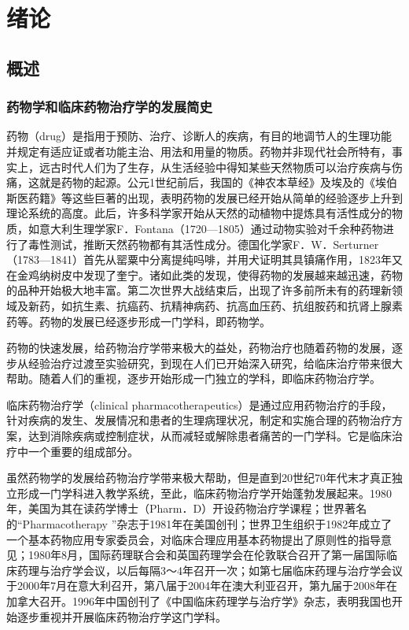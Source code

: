 \chapter{绪论}

\section{概述}

\subsection{药物学和临床药物治疗学的发展简史}

药物（drug）是指用于预防、治疗、诊断人的疾病，有目的地调节人的生理功能并规定有适应证或者功能主治、用法和用量的物质。药物并非现代社会所特有，事实上，远古时代人们为了生存，从生活经验中得知某些天然物质可以治疗疾病与伤痛，这就是药物的起源。公元1世纪前后，我国的《神农本草经》及埃及的《埃伯斯医药籍》等这些巨著的出现，表明药物的发展已经开始从简单的经验逐步上升到理论系统的高度。此后，许多科学家开始从天然的动植物中提炼具有活性成分的物质，如意大利生理学家F．Fontana（1720---1805）通过动物实验对千余种药物进行了毒性测试，推断天然药物都有其活性成分。德国化学家F．W．Serturner（1783---1841）首先从罂粟中分离提纯吗啡，并用犬证明其具镇痛作用，1823年又在金鸡纳树皮中发现了奎宁。诸如此类的发现，使得药物的发展越来越迅速，药物的品种开始极大地丰富。第二次世界大战结束后，出现了许多前所未有的药理新领域及新药，如抗生素、抗癌药、抗精神病药、抗高血压药、抗组胺药和抗肾上腺素药等。药物的发展已经逐步形成一门学科，即药物学。

药物的快速发展，给药物治疗学带来极大的益处，药物治疗也随着药物的发展，逐步从经验治疗过渡至实验研究，到现在人们已开始深入研究，给临床治疗带来很大帮助。随着人们的重视，逐步开始形成一门独立的学科，即临床药物治疗学。

临床药物治疗学（clinical
pharmacotherapeutics）是通过应用药物治疗的手段，针对疾病的发生、发展情况和患者的生理病理状况，制定和实施合理的药物治疗方案，达到消除疾病或控制症状，从而减轻或解除患者痛苦的一门学科。它是临床治疗中一个重要的组成部分。

虽然药物学的发展给药物治疗学带来极大帮助，但是直到20世纪70年代末才真正独立形成一门学科进入教学系统，至此，临床药物治疗学开始蓬勃发展起来。1980年，美国为其在读药学博士（Pharm．D）开设药物治疗学课程；世界著名的“{Pharmacotherapy}
”杂志于1981年在美国创刊；世界卫生组织于1982年成立了一个基本药物应用专家委员会，对临床合理应用基本药物提出了原则性的指导意见；1980年8月，国际药理联合会和英国药理学会在伦敦联合召开了第一届国际临床药理与治疗学会议，以后每隔3～4年召开一次；如第七届临床药理与治疗学会议于2000年7月在意大利召开，第八届于2004年在澳大利亚召开，第九届于2008年在加拿大召开。1996年中国创刊了《中国临床药理学与治疗学》杂志，表明我国也开始逐步重视并开展临床药物治疗学这门学科。


